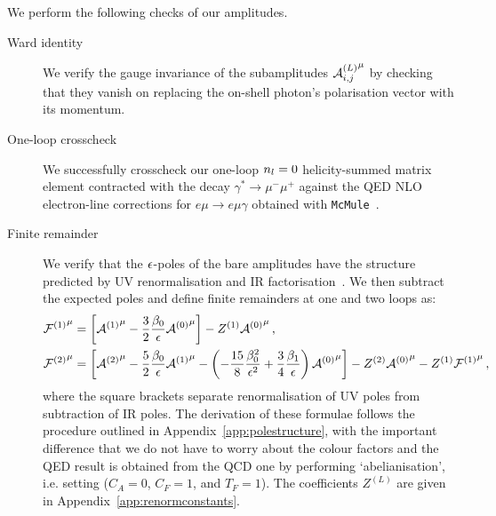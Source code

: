 \documentclass[main.tex]{subfiles}
\begin{document}
\smallskip

We perform the following checks of our amplitudes.
\begin{description}
    \item[Ward identity]
        We verify the gauge invariance of the subamplitudes ${\mathcal{A}^{(L)}_{i, j}}^{\mu}$ by checking that they vanish on replacing the on-shell photon's polarisation vector with its momentum.

    \item[One-loop crosscheck]
        We successfully crosscheck our one-loop $n_l=0$ helicity-summed matrix element contracted with the decay $\gamma^*\to\mu^-\mu^+$ against the \ac{QED} \ac{NLO} electron-line corrections for $e\mu\to e\mu\gamma$ obtained with \texttt{McMule}~\cite{Banerjee:2020rww,ulrich_yannick_2022_6046769}.

    \item[Finite remainder]
      We verify that the $\epsilon$-poles of the bare amplitudes have the structure predicted by \ac{UV} renormalisation and \ac{IR} factorisation~\cite{Catani:1998bh,Gardi:2009qi,Gardi:2009zv,Becher:2009cu,Becher:2009qa}. We then subtract the expected poles and define finite remainders at one and two loops as:
        \begin{subequations}
            \label{eqQED:finite-remainders}
            \begin{align}
                {\mathcal{F}^{(1)}}^\mu &= \left[ {\mathcal{A}^{(1)}}^{\mu} - \frac{3}{2}\frac{\beta_0}{\epsilon} {\mathcal{A}^{(0)}}^{\mu} \right] - Z^{(1)} {\mathcal{A}^{(0)}}^{\mu} \,,\\
                {\mathcal{F}^{(2)}}^\mu &= \left[ {\mathcal{A}^{(2)}}^{\mu} - \frac{5}{2}\frac{\beta_0}{\epsilon} {\mathcal{A}^{(1)}}^{\mu} - \left(-\frac{15}{8}\frac{\beta_0^2}{\epsilon^2}+\frac{3}{4}\frac{\beta_1}{\epsilon}\right) {\mathcal{A}^{(0)}}^{\mu} \right] - Z^{(2)} {\mathcal{A}^{(0)}}^{\mu} - Z^{(1)} {\mathcal{F}^{(1)}}^\mu \,,
            \end{align}
        \end{subequations}
        where the square brackets separate renormalisation of \ac{UV} poles from subtraction of \ac{IR} poles. The derivation of these formulae follows the procedure outlined in Appendix~\ref{app:polestructure}, with the important difference that we do not have to worry about the colour factors and the QED result is obtained from the QCD one by performing `abelianisation', i.e. setting ($C_A=0$, $C_F=1$, and $T_F=1$). The coefficients $Z^{(L)}$ are given in Appendix~\ref{app:renormconstants}.
\end{description}
\end{document}
